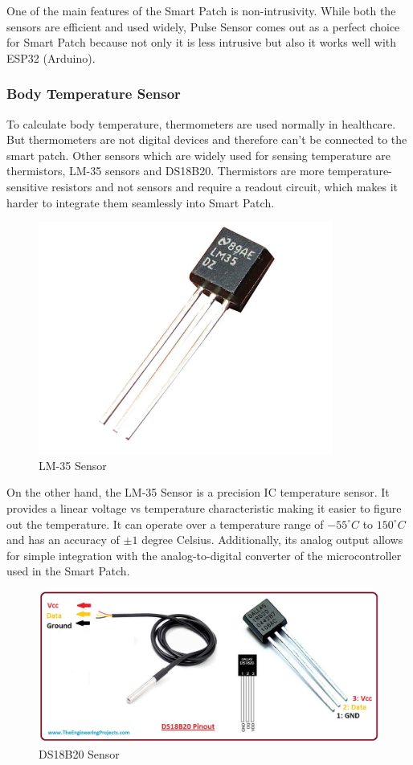 One of the main features of the Smart Patch is non-intrusivity. While both the sensors are efficient and used widely, Pulse Sensor comes out as a perfect choice for Smart Patch because not only it is less intrusive but also it works well with ESP32 (Arduino).

\subsubsection{Body Temperature Sensor}
To calculate body temperature, thermometers are used normally in healthcare. But thermometers are not digital devices and therefore can’t be connected to the smart patch. Other sensors which are widely used for sensing temperature are thermistors, LM-35 sensors and DS18B20. Thermistors are more temperature-sensitive resistors and not sensors and require a readout circuit, which makes it harder to integrate them seamlessly into Smart Patch.  \\

\begin{figure}[!h]
    \centering
    \includegraphics[width=0.25\linewidth]{images/lm-35-image.png}
    \caption{LM-35 Sensor \cite{ref28}}
    \label{fig:lm-35-sensor}
\end{figure}

\noindent On the other hand, the LM-35 Sensor is a precision IC temperature sensor. It provides a linear voltage vs temperature characteristic making it easier to figure out the temperature. It can operate over a temperature range of \(−55 ^\circ C\) to \(150 ^\circ C\) and has an accuracy of \(\pm1\) degree Celsius. Additionally, its analog output allows for simple integration with the analog-to-digital converter of the microcontroller used in the Smart Patch. \\

\begin{figure}[h!]
    \centering
    \includegraphics[width=0.75\linewidth]{images/ds18b20.png}
    \caption{DS18B20 Sensor \cite{51}}
    \label{fig:ds18b20}
\end{figure}

